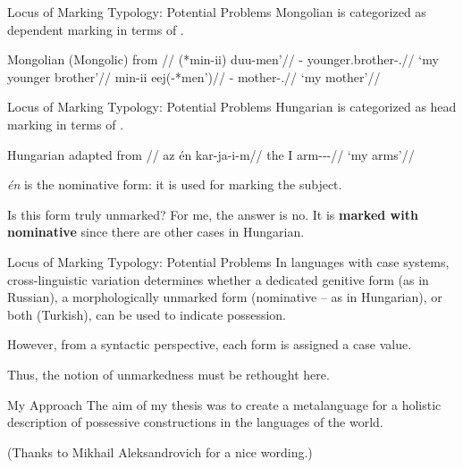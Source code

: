 \documentclass[12pt,aspectratio=169,t]{beamer}
\renewcommand{\'}{\textquotesingle}
\begin{document}
\begin{frame}{Locus of Marking Typology: Potential Problems}
	Mongolian is categorized as dependent marking in terms of \cite{nichols_locus_2013}.
	
	\pex
	\glpreamble Mongolian (Mongolic) from \cite{janhunen_mongolian_2012}//
	\a
	\begingl
	\gla (*min-ii) duu-men'//
	\glb \Fsg-\Gen{} younger.brother-\Poss.\First//
	\glft `my younger brother'//
	\endgl
	\a
	\begingl
	\gla min-ii eej(-*men')//
	\glb \Fsg-\Gen{} mother-\Poss.\First//
	\glft `my mother'//
	\endgl
	\xe
\end{frame}

\begin{frame}{Locus of Marking Typology: Potential Problems}
	Hungarian is categorized as head marking in terms of \cite{nichols_locus_2013}.
	
	\ex
	\begingl
	\glpreamble Hungarian adapted from \cite[263]{szabolcsi1981possessive}//
	\gla az én kar-ja-i-m//
	\glb the I arm-\Poss-\Pl-\Fsg//
	\glft `my arms'//
	\endgl
	\xe
	
	\pause
	\textit{én} is the nominative form: it is used for marking the subject.
	
	\pause
	Is this form truly unmarked? For me, the answer is no. It is \textbf{marked with nominative} since there are other cases in Hungarian.
\end{frame}

\begin{frame}{Locus of Marking Typology: Potential Problems}
	In languages with case systems, cross-linguistic variation determines whether a dedicated genitive form (as in Russian), a morphologically unmarked form (nominative -- as in Hungarian), or both (Turkish), can be used to indicate possession.
	
	However, from a syntactic perspective, each form is assigned a case value.
	
	\pause
	Thus, the notion of unmarkedness must be rethought here.
\end{frame}

\begin{frame}{My Approach}
	The aim of my thesis was to create a metalanguage for a holistic description of possessive constructions in the languages of the world.
	
	\vspace{-0.5cm}
	\hfill {\footnotesize (Thanks to Mikhail Aleksandrovich for a nice wording.)}

	
\end{frame}
\end{document}
